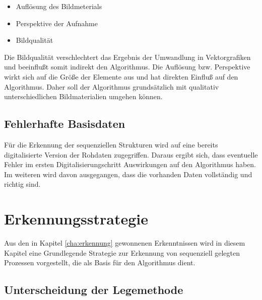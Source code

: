 \begin{itemize}
	\item Auflösung des Bildmeterials
	\item Perspektive der Aufnahme
	\item Bildqualität
\end{itemize}

Die Bildqualität verschlechtert das Ergebnis der Umwandlung in Vektorgrafiken und beeinflußt somit indirekt den Algorithmus. Die Auflösung bzw. Perspektive wirkt sich auf die Größe der Elemente aus und hat direkten Einfluß auf den Algorithmus. Daher soll der Algorithmus grundsätzlich mit qualitativ unterschiedlichen Bildmaterialien umgehen können.

\subsection{Fehlerhafte Basisdaten} %
\label{sub:fehlerhafte_basisdaten}
Für die Erkennung der sequenziellen Strukturen wird auf eine bereits digitalisierte Version der Rohdaten zugegriffen. Daraus ergibt sich, dass eventuelle Fehler im ersten Digitalisierungschritt Auswirkungen auf den Algorithmus haben. Im weiteren wird davon ausgegangen, dass die vorhanden Daten vollständig und richtig sind.


\section{Erkennungsstrategie} %
\label{sec:erkennungsstrategie}
Aus den in Kapitel \ref{cha:erkennung} gewonnenen Erkenntnissen wird in diesem Kapitel eine Grundlegende Strategie zur Erkennung von sequenziell gelegten Prozessen vorgestellt, die als Basis für den Algorithmus dient.

\subsection{Unterscheidung der Legemethode} %
\label{sub:unterscheidung_der_legemethode}

